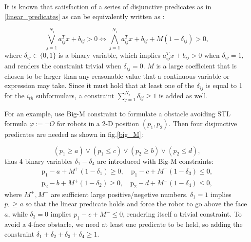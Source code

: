\documentclass[a4paper]{report}
\begin{document}

It is known that satisfaction of a series of disjunctive predicates as in \ref*{linear_predicates} as can be equivalently written as \cite{Maryam2019}:

\begin{equation}
\bigvee_{j=1}^{N_i} a_{ij}^Tx+b_{ij}>0 \Leftrightarrow \bigwedge_{j=1}^{N_i}a_{ij}^Tx+b_{ij}+M(1-\delta_{ij})>0,
\end{equation}
where $\delta_{ij} \in \{0,1\}$ is a binary variable, which implies $a_{ij}^Tx+b_{ij}>0$ when $\delta_{ij}=1$, and renders the constraint trivial when $\delta_{ij}=0$. $M$ is a large coefficient that is chosen to be larger than any reasonable value that a continuous variable or expression may take. 
Since it must hold that at least one of the $\delta_{ij}$ is equal to 1 for the $i_{th}$ subformulars, a constraint $\sum_{j=1}^{N_i} \delta_{ij} \geq 1$ is added as well. 

For an example, use Big-M constraint to formulate a obstacle avoiding STL formula $\varphi := \lnot O $ for robots in a 2-D position $(p_1,p_2)$. Then four disjunctive predicates are needed as shown in fig.\ref*{big_M}:


\begin{equation}
    (p_1 \geq a) \vee (p_1 \leq c) \vee (p_2 \geq b) \vee (p_2 \leq d),
\end{equation}
thus 4 binary variables $\delta_1 - \delta_4 $ are introduced with Big-M constraints: 
\begin{equation}
\begin{split}
    \mathrm{p}_1-a + M^+\left(1-\delta_1\right)\geq 0,
    \quad \mathrm{p}_1-c + M^-\left(1-\delta_3\right) \leq 0, \\
    \mathrm{p}_2-b + M^+\left(1-\delta_2\right) \geq 0, \quad \mathrm{p}_2-d + M^-\left(1-\delta_4\right) \leq 0,
\end{split}
\end{equation}
where $M^+,M^-$ are sufficient large positive/negetive numbers. $\delta_1 = 1$ implies $p_1 \geq a$ so that the linear predicate holds and force the robot to go above the face $a$, while $\delta_3 = 0$ implies $p_1 - c +M^-\leq 0$, rendering itself a trivial constraint. To avoid a 4-face obstacle, we need at least one predicate to be held, so adding the constraint $\delta_1+\delta_2+\delta_3+\delta_4 \geq 1$.
\end{document}

